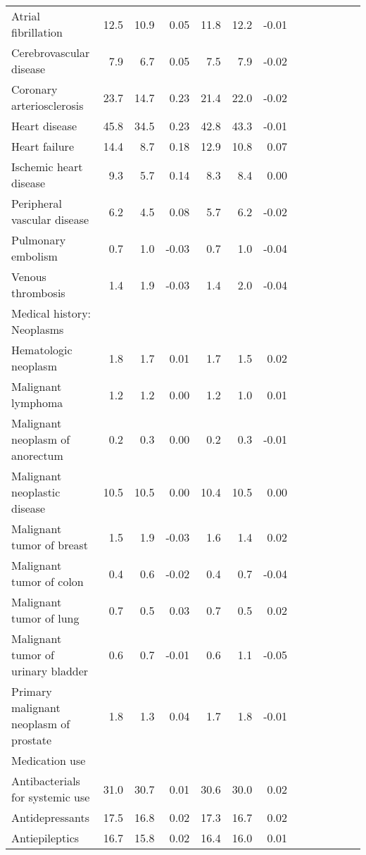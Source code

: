 \documentclass[11pt,]{article}
\begin{document}
\begin{longtable}{lrrrrrrrrrrrr}
      Atrial fibrillation & 12.5 & 10.9 &  0.05 & 11.8 & 12.2 & -0.01 \\ 
      Cerebrovascular disease &  7.9 &  6.7 &  0.05 &  7.5 &  7.9 & -0.02 \\ 
      Coronary arteriosclerosis & 23.7 & 14.7 &  0.23 & 21.4 & 22.0 & -0.02 \\ 
      Heart disease & 45.8 & 34.5 &  0.23 & 42.8 & 43.3 & -0.01 \\ 
      Heart failure & 14.4 &  8.7 &  0.18 & 12.9 & 10.8 &  0.07 \\ 
      Ischemic heart disease &  9.3 &  5.7 &  0.14 &  8.3 &  8.4 &  0.00 \\ 
      Peripheral vascular disease &  6.2 &  4.5 &  0.08 &  5.7 &  6.2 & -0.02 \\ 
      Pulmonary embolism &  0.7 &  1.0 & -0.03 &  0.7 &  1.0 & -0.04 \\ 
      Venous thrombosis &  1.4 &  1.9 & -0.03 &  1.4 &  2.0 & -0.04 \\ 
  Medical history: Neoplasms &    &    &     &    &    &     \\ 
      Hematologic neoplasm &  1.8 &  1.7 &  0.01 &  1.7 &  1.5 &  0.02 \\ 
      Malignant lymphoma &  1.2 &  1.2 &  0.00 &  1.2 &  1.0 &  0.01 \\ 
      Malignant neoplasm of anorectum &  0.2 &  0.3 &  0.00 &  0.2 &  0.3 & -0.01 \\ 
      Malignant neoplastic disease & 10.5 & 10.5 &  0.00 & 10.4 & 10.5 &  0.00 \\ 
      Malignant tumor of breast &  1.5 &  1.9 & -0.03 &  1.6 &  1.4 &  0.02 \\ 
      Malignant tumor of colon &  0.4 &  0.6 & -0.02 &  0.4 &  0.7 & -0.04 \\ 
      Malignant tumor of lung &  0.7 &  0.5 &  0.03 &  0.7 &  0.5 &  0.02 \\ 
      Malignant tumor of urinary bladder &  0.6 &  0.7 & -0.01 &  0.6 &  1.1 & -0.05 \\ 
      Primary malignant neoplasm of prostate &  1.8 &  1.3 &  0.04 &  1.7 &  1.8 & -0.01 \\ 
  Medication use &    &    &     &    &    &     \\ 
      Antibacterials for systemic use & 31.0 & 30.7 &  0.01 & 30.6 & 30.0 &  0.02 \\ 
      Antidepressants & 17.5 & 16.8 &  0.02 & 17.3 & 16.7 &  0.02 \\ 
      Antiepileptics & 16.7 & 15.8 &  0.02 & 16.4 & 16.0 &  0.01 \\ 

\end{longtable}
\end{document}
